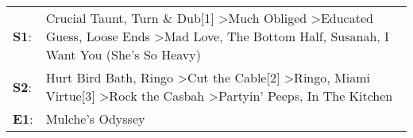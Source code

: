 \begin{supertabular}{p{0.03\textwidth}p{0.92\textwidth}}
 \textbf{S1}:  &  Crucial Taunt\textsuperscript{}, \enspace Turn \& Dub[1]\textsuperscript{} \textgreater \enspace Much Obliged\textsuperscript{} \textgreater \enspace Educated Guess\textsuperscript{}, \enspace Loose Ends\textsuperscript{} \textgreater \enspace Mad Love\textsuperscript{}, \enspace The Bottom Half\textsuperscript{}, \enspace Susanah\textsuperscript{}, \enspace I Want You (She's So Heavy)\textsuperscript{}  \enspace  \\
 \textbf{S2}:  &                                         Hurt Bird Bath\textsuperscript{}, \enspace Ringo\textsuperscript{} \textgreater \enspace Cut the Cable[2]\textsuperscript{} \textgreater \enspace Ringo\textsuperscript{}, \enspace Miami Virtue[3]\textsuperscript{} \textgreater \enspace Rock the Casbah\textsuperscript{} \textgreater \enspace Partyin' Peeps\textsuperscript{}, \enspace In The Kitchen\textsuperscript{}  \enspace  \\
 \textbf{E1}:  &                                                                                                                                                                                                                                                                                                                                                                                      Mulche's Odyssey\textsuperscript{}  \enspace  \\
\end{supertabular}
